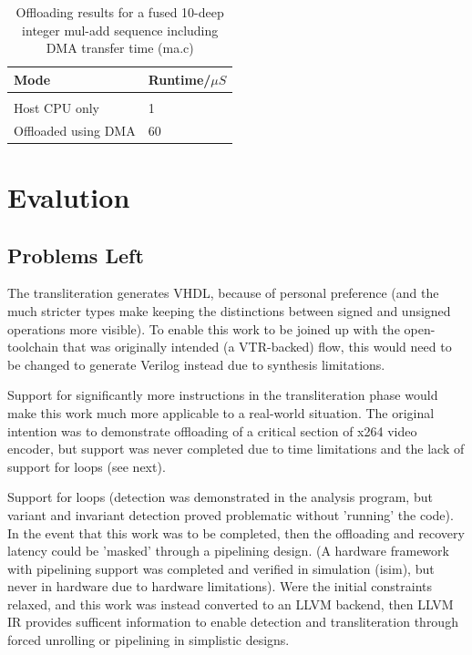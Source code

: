 \documentclass[a4paper]{article}
\begin{document}
  \begin{table}[tbp]
    \centering
    \begin{tabular}{l|l}
      Mode & Runtime/$\mu S$\\
      \hline\\
      Host CPU only & 1 \\
      Offloaded using DMA & 60
    \end{tabular}
    \caption{Offloading results for a fused 10-deep integer mul-add sequence including DMA transfer time (ma.c)}
    \label{table:offload-simple}
  \end{table}

\section{Evalution}
\subsection{Problems Left}
The transliteration generates VHDL, because of personal preference (and the much stricter types make keeping the distinctions between signed and unsigned operations more visible). To enable this work to be joined up with the open-toolchain that was originally intended (a VTR-backed) flow, this would need to be changed to generate Verilog instead due to synthesis limitations.

Support for significantly more instructions in the transliteration phase would make this work much more applicable to a real-world situation. The original intention was to demonstrate offloading of a critical section of x264 video encoder, but support was never completed due to time limitations and the lack of support for loops (see next).

Support for loops (detection was demonstrated in the analysis program, but variant and invariant detection proved problematic without 'running' the code). In the event that this work was to be completed, then the offloading and recovery latency could be 'masked' through a pipelining design. (A hardware framework with pipelining support was completed and verified in simulation (isim), but never in hardware due to hardware limitations). Were the initial constraints relaxed, and this work was instead converted to an LLVM backend, then LLVM IR provides sufficent information to enable detection and transliteration through forced unrolling or pipelining in simplistic designs.
\end{document}
